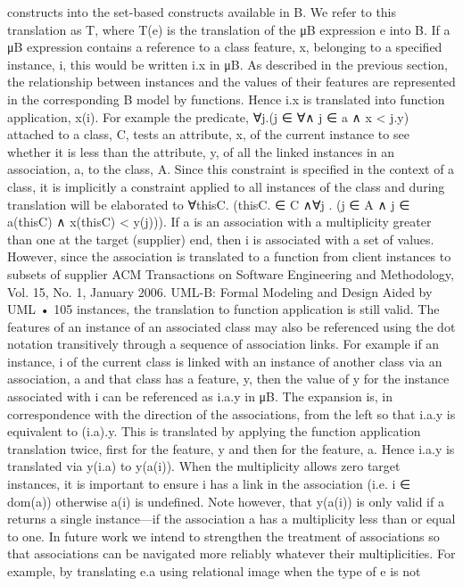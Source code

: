 constructs into the set-based constructs available in B. We refer to this translation as T, where T(e) is the translation of the μB expression e into B.
If a μB expression contains a reference to a class feature, x, belonging to
a specified instance, i, this would be written i.x in μB. As described in the
previous section, the relationship between instances and the values of their
features are represented in the corresponding B model by functions. Hence
i.x is translated into function application, x(i). For example the predicate,
∀j.(j ∈ ∀∧ j ∈ a ∧ x < j.y) attached to a class, C, tests an attribute, x, of the current instance to see whether it is less than the attribute, y, of all the linked
instances in an association, a, to the class, A. Since this constraint is specified
in the context of a class, it is implicitly a constraint applied to all instances of
the class and during translation will be elaborated to ∀thisC. (thisC. ∈ C ∧∀j .
(j ∈ A ∧ j ∈ a(thisC) ∧ x(thisC) < y(j))).
If a is an association with a multiplicity greater than one at the target (supplier) end, then i is associated with a set of values. However, since the association is translated to a function from client instances to subsets of supplier
ACM Transactions on Software Engineering and Methodology, Vol. 15, No. 1, January 2006.
UML-B: Formal Modeling and Design Aided by UML • 105
instances, the translation to function application is still valid. The features of
an instance of an associated class may also be referenced using the dot notation transitively through a sequence of association links. For example if an
instance, i of the current class is linked with an instance of another class via
an association, a and that class has a feature, y, then the value of y for the
instance associated with i can be referenced as i.a.y in μB. The expansion is,
in correspondence with the direction of the associations, from the left so that
i.a.y is equivalent to (i.a).y. This is translated by applying the function application translation twice, first for the feature, y and then for the feature, a. Hence
i.a.y is translated via y(i.a) to y(a(i)). When the multiplicity allows zero target
instances, it is important to ensure i has a link in the association (i.e. i ∈ dom(a))
otherwise a(i) is undefined. Note however, that y(a(i)) is only valid if a returns
a single instance—if the association a has a multiplicity less than or equal to
one. In future work we intend to strengthen the treatment of associations so
that associations can be navigated more reliably whatever their multiplicities.
For example, by translating e.a using relational image when the type of e is not
